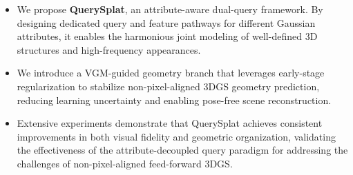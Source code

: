 \documentclass[letterpaper]{article} %
\begin{document}
\begin{itemize}
    \item We propose \textbf{QuerySplat}, an attribute-aware dual-query framework. By designing dedicated query and feature pathways for different Gaussian attributes, it enables the harmonious joint modeling of well-defined 3D structures and high-frequency appearances.

    \item We introduce a VGM-guided geometry branch that leverages early-stage regularization to stabilize non-pixel-aligned 3DGS geometry prediction, reducing learning uncertainty and enabling pose-free scene reconstruction.

    \item Extensive experiments demonstrate that QuerySplat achieves consistent improvements in both visual fidelity and geometric organization, validating the effectiveness of the attribute-decoupled query paradigm for addressing the challenges of non-pixel-aligned feed-forward 3DGS.
\end{itemize}
\end{document}
